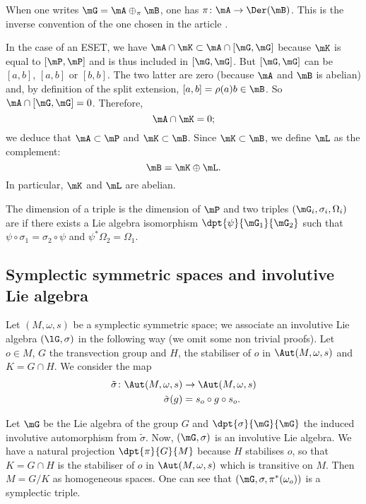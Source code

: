 \begin{remark}
When one writes $\mG=\mA\oplus_{\pi}\mB$, one has $\pi\colon \mA\to \Der(\mB)$. This is the inverse convention of the one chosen in the article \cite{StrictSolvableSym}.
\end{remark}

 In the case of an ESET, we have $\mA\cap\mK\subset\mA\cap[\mG,\mG]$ because $\mK$ is equal to $[\mP,\mP]$ and is thus included in $[\mG,\mG]$. But $[\mG,\mG]$ can be $[a,b]$, $[a,b]$ or $[b,b]$. The two latter are zero (because $\mA$ and $\mB$ is abelian) and, by definition of the split extension, $[a,b]=\rho(a)b\in\mB$. So $\mA\cap[\mG,\mG]=0$. Therefore,
\[ 
  \mA\cap\mK=0;
\]
we deduce that $\mA\subset\mP$ and $\mK\subset \mB$. Since $\mK\subset\mB$, we define $\mL$ as the complement:
\[ 
  \mB=\mK\oplus\mL.
\]
In particular, $\mK$ and $\mL$ are abelian.

The dimension of a triple is the dimension of $\mP$ and two triples $(\mG_i,\sigma_i,\Omega_i)$ are  if there exists a Lie algebra isomorphism $\dpt{\psi}{\mG_1}{\mG_2}$ such that $\psi\circ\sigma_1=\sigma_2\circ \psi$ and $\psi^*\Omega_2=\Omega_1$.

\subsection{Symplectic symmetric spaces and involutive Lie algebra}

Let $(M,\omega,s)$ be a symplectic symmetric space; we associate an involutive Lie algebra $(\lG,\sigma)$ in the following way (we omit some non trivial proofs). Let $o\in M$, $G$ the transvection group and $H$, the stabiliser of $o$ in $\Aut(M,\omega,s)$ and $K=G\cap H$. We consider the map
\begin{equation}
	\begin{aligned}
		\tilde\sigma\colon \Aut(M,\omega,s)&\to \Aut(M,\omega,s) \\
		\tilde\sigma(g)&=s_o\circ g\circ s_o. 
	\end{aligned}
\end{equation}

Let $\mG$ be the Lie algebra of the group $G$ and $\dpt{\sigma}{\mG}{\mG}$ the induced involutive automorphism from $\tilde\sigma$. Now, $(\mG,\sigma)$ is an involutive Lie algebra. We have a natural projection $\dpt{\pi}{G}{M}$ because $H$ stabilises $o$, so that $K=G\cap H$ is the stabiliser of $o$ in $\Aut(M,\omega,s)$ which is transitive on $M$. Then $M=G/K$ as homogeneous spaces. One can see that $(\mG,\sigma,\pi^*(\omega_o))$ is a symplectic triple.

